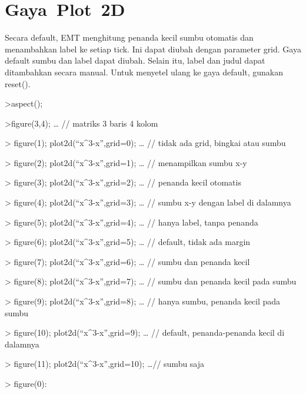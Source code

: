 \documentclass[
]{book}
\begin{document}
\section{Gaya~Plot~2D}\label{gaya-plot-2d}

Secara default, EMT menghitung penanda kecil sumbu otomatis dan menambahkan label ke setiap tick. Ini dapat diubah dengan parameter grid. Gaya default sumbu dan label dapat diubah. Selain itu, label dan judul dapat ditambahkan secara manual. Untuk menyetel ulang ke gaya default, gunakan reset().

\textgreater aspect();

\textgreater figure(3,4); \ldots{} // matriks 3 baris 4 kolom

\textgreater{} figure(1); plot2d(``x\^{}3-x'',grid=0); \ldots{} // tidak ada grid, bingkai atau sumbu

\textgreater{} figure(2); plot2d(``x\^{}3-x'',grid=1); \ldots{} // menampilkan sumbu x-y

\textgreater{} figure(3); plot2d(``x\^{}3-x'',grid=2); \ldots{} // penanda kecil otomatis

\textgreater{} figure(4); plot2d(``x\^{}3-x'',grid=3); \ldots{} // sumbu x-y dengan label di dalamnya

\textgreater{} figure(5); plot2d(``x\^{}3-x'',grid=4); \ldots{} // hanya label, tanpa penanda

\textgreater{} figure(6); plot2d(``x\^{}3-x'',grid=5); \ldots{} // default, tidak ada margin

\textgreater{} figure(7); plot2d(``x\^{}3-x'',grid=6); \ldots{} // sumbu dan penanda kecil

\textgreater{} figure(8); plot2d(``x\^{}3-x'',grid=7); \ldots{} // sumbu dan penanda kecil pada sumbu

\textgreater{} figure(9); plot2d(``x\^{}3-x'',grid=8); \ldots{} // hanya sumbu, penanda kecil pada sumbu

\textgreater{} figure(10); plot2d(``x\^{}3-x'',grid=9); \ldots{} // default, penanda-penanda kecil di dalamnya

\textgreater{} figure(11); plot2d(``x\^{}3-x'',grid=10); \ldots// sumbu saja

\textgreater{} figure(0):
\end{document}
